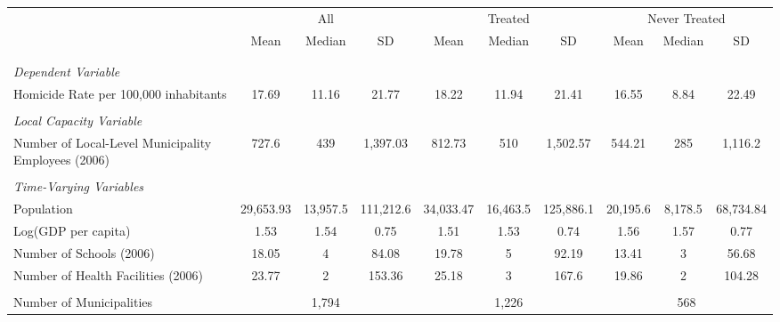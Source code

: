 \documentclass[12pt]{article}
\begin{document}
\begin{table}[!htbp]
\centering
\begin{adjustbox}{width=\textwidth}
\begin{tabular}{l|ccc|ccc|ccc}
\hline\hline
& \multicolumn{3}{c|}{All} & \multicolumn{3}{c|}{Treated} & \multicolumn{3}{c}{Never Treated} \\
\cline{2-10}
& Mean & Median & SD & Mean & Median & SD & Mean & Median & SD \\
\hline
\\[-1.8ex]\\
\multicolumn{10}{l}{\textit{Dependent Variable}} \\
\hline
Homicide Rate per 100,000 inhabitants & 17.69 & 11.16 & 21.77 & 18.22 & 11.94 & 21.41 & 16.55 & 8.84 & 22.49 \\
\\[-1.8ex]
\multicolumn{10}{l}{\textit{Local Capacity Variable}} \\
\hline
Number of Local-Level Municipality Employees (2006) & 727.6 & 439 & 1,397.03 & 812.73 & 510 & 1,502.57 & 544.21 & 285 & 1,116.2 \\
\\[-1.8ex]
\multicolumn{10}{l}{\textit{Time-Varying Variables}} \\
\hline
Population & 29,653.93 & 13,957.5 & 111,212.6 & 34,033.47 & 16,463.5 & 125,886.1 & 20,195.6 & 8,178.5 & 68,734.84 \\
Log(GDP per capita) & 1.53 & 1.54 & 0.75 & 1.51 & 1.53 & 0.74 & 1.56 & 1.57 & 0.77 \\
Number of Schools (2006) & 18.05 & 4 & 84.08 & 19.78 & 5 & 92.19 & 13.41 & 3 & 56.68 \\
Number of Health Facilities (2006) & 23.77 & 2 & 153.36 & 25.18 & 3 & 167.6 & 19.86 & 2 & 104.28 \\
\\[-1.8ex]
\hline
Number of Municipalities & \multicolumn{3}{c|}{1,794} & \multicolumn{3}{c|}{1,226} & \multicolumn{3}{c}{568} \\
\hline\hline
\end{tabular}
\end{adjustbox}
\label{tab:descriptive_stats}
\end{table}
\end{document}
